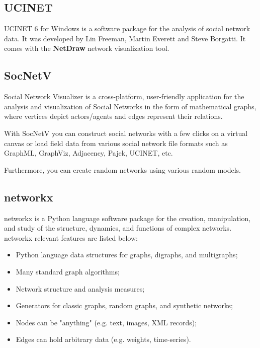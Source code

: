 \subsection{UCINET}

\indent \indent UCINET 6 \cite{ucinet-software} for Windows is a software package for the analysis of social network data. It was developed by Lin Freeman, Martin Everett and Steve Borgatti. It comes with the \textbf{NetDraw} \cite{borgatti2002netdraw} network visualization tool.

\subsection{SocNetV}

\indent \indent Social Network Visualizer \cite{socnetv} is a cross-platform, user-friendly application for the analysis and visualization of Social Networks in the form of mathematical graphs, where vertices depict actors/agents and edges represent their relations.

With SocNetV you can construct social networks with a few clicks on a virtual canvas or load field data from various social network file formats such as GraphML, GraphViz, Adjacency, Pajek, UCINET, etc.

Furthermore, you can create random networks using various random models.

\subsection{networkx}
\indent \indent networkx \cite{hagberg2013networkx} is a Python language software package for the creation, manipulation, and study of the structure, dynamics, and functions of complex networks. networkx relevant features are listed below:
\begin{itemize}
    \item Python language data structures for graphs, digraphs, and multigraphs;
    \item Many standard graph algorithms;
    \item Network structure and analysis measures;
    \item Generators for classic graphs, random graphs, and synthetic networks;
    \item Nodes can be "anything" (e.g. text, images, XML records);
    \item Edges can hold arbitrary data (e.g. weights, time-series).
\end{itemize}

